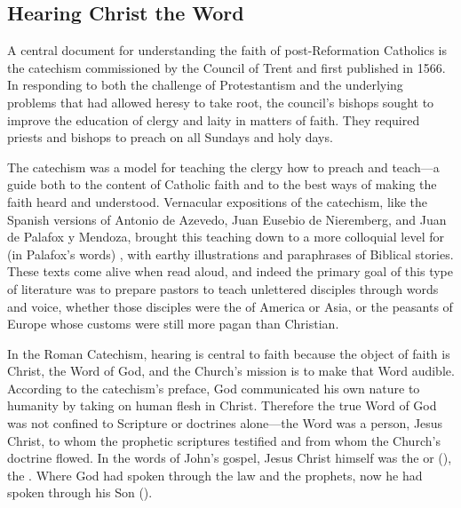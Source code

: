 \subsection{Hearing Christ the Word}

A central document for understanding the faith of post-Reformation Catholics is 
the catechism  commissioned by the Council of Trent 
and first published in 1566.%
    \Autocites{Catholic:Catechismus1614}[]{NewCatholic}
In responding to both the challenge of Protestantism and the underlying 
problems that had allowed heresy to take root, the council's bishops sought to 
improve the education of clergy and laity in matters of faith.
They required priests and bishops to preach on all Sundays and holy days.%
    \Autocite[]{NewCatholic}

The catechism was a model for teaching the clergy how to preach and teach---a 
guide both to the content of Catholic faith and to the best ways of making the 
faith heard and understood.
Vernacular expositions of the catechism, like the Spanish versions of Antonio 
de Azevedo, Juan Eusebio de Nieremberg, and Juan de Palafox y Mendoza, brought 
this teaching down to a more colloquial level for (in Palafox's words) 
, with earthy illustrations and paraphrases of 
Biblical stories.%
    \Autocites{Azevedo:Catecismo}{Nieremberg:PracticaCatecismo}{Palafox:Bocados}
These texts come alive when read aloud, and indeed the primary goal of this 
type of literature was to prepare pastors to teach unlettered disciples through 
words and voice, whether those disciples were the  of America 
or Asia, or the peasants of Europe whose customs were still more pagan than 
Christian.%
    \Autocites
    [On Europe as a mission front after Trent, see]
    [60--63]{Kamen:EarlyModernSociety}

In the Roman Catechism, hearing is central to faith because the object of faith 
is Christ, the Word of God, and the Church's mission is to make that Word 
audible.
According to the catechism's preface, God communicated his own nature to 
humanity by taking on human flesh in Christ.
Therefore the true Word of God was not confined to Scripture or doctrines 
alone---the Word was a person, Jesus Christ, to whom the prophetic scriptures 
testified and from whom the Church's doctrine flowed.%
    \Autocite
    [9: .]
    {Catholic:Catechismus1614}
In the words of John's gospel, Jesus Christ himself was the  or 
 (), the .
Where God had spoken through the law and the prophets, now he had spoken 
through his Son ().

